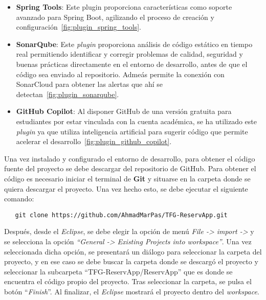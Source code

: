 \begin{itemize}
   \item \textbf{Spring Tools}: Este plugin proporciona características como soporte avanzado para Spring Boot, agilizando el proceso de creación y configuración~\ref{fig:plugin_spring_tools}.
   
   
   \item \textbf{SonarQube}: Este \emph{plugin} proporciona análisis de código estático en tiempo real permitiendo identificar y corregir problemas de calidad, seguridad y buenas prácticas directamente en el entorno de desarrollo, antes de que el código sea enviado al repositorio. Admeás permite la conexión con SonarCloud para obtener las alertas que ahí se detectan~\ref{fig:plugin_sonarqube}.

   
   \item \textbf{GitHub Copilot}: Al disponer GitHub de una versión gratuita para estudiantes por estar vinculada con la cuenta académica, se ha utilizado este \emph{plugin} ya que utiliza inteligencia
artificial para sugerir código que permite acelerar el desarrollo~\ref{fig:plugin_github_copilot}.


\end{itemize}

Una vez instalado y configurado el entorno de desarrollo, para obtener el código fuente del proyecto se debe descargar del repositorio de GitHub. Para obtener el código es necesario iniciar el terminal de \textbf{Git} y situarse en la carpeta donde se quiera descargar el proyecto. Una vez hecho esto, se debe ejecutar el siguiente comando:
\begin{verbatim}
   git clone https://github.com/AhmadMarPas/TFG-ReservApp.git
\end{verbatim}
Después, desde el \textit{Eclipse}, se debe elegir la opción de menú \emph{File -> import ->} y se selecciona la opción \emph{``General -> Existing Projects into workspace''}. Una vez seleccionada dicha opción, se presentará un diálogo para seleccionar la carpeta del proyecto, y en ese caso se debe buscar la carpeta donde se descargó el proyecto y seleccionar la subcarpeta ``TFG-ReservApp/ReservApp'' que es donde se encuentra el código propio del proyecto. Tras seleccionar la carpeta, se pulsa el botón ``\emph{Finish}''. Al finalizar, el \textit{Eclipse} mostrará el proyecto dentro del \emph{workspace}.

